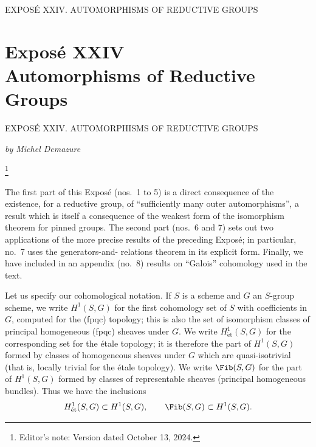 
  {EXPOSÉ XXIV. AUTOMORPHISMS OF REDUCTIVE GROUPS}

\setcounter{footnote}{0}
\chapter*{Exposé XXIV\\
Automorphisms of Reductive Groups}
  {EXPOSÉ XXIV. AUTOMORPHISMS OF REDUCTIVE GROUPS}

\begin{center}
  \textit{by Michel Demazure}
\end{center}

\begingroup
\renewcommand{\thefootnote}{0}
\footnote{Editor's note: Version dated October 13, 2024.}
\addtocounter{footnote}{-1}
\endgroup
The first part of this Exposé (nos.~1 to 5) is a direct consequence of
the existence, for a reductive group, of ``sufficiently many outer
automorphisms'', a result which is itself a consequence of the weakest
form of the isomorphism theorem for pinned groups. The second part
(nos.~6 and 7) sets out two applications of the more precise results of
the preceding Exposé; in particular, no.~7 uses the generators-and-
relations theorem in its explicit form. Finally, we have included in
an appendix (no.~8) results on ``Galois'' cohomology used in the text.

Let us specify our cohomological notation. If \(S\) is a scheme and
\(G\) an \(S\)-group scheme, we write \(H^1(S,G)\) for the first
cohomology set of \(S\) with coefficients in \(G\), computed for the
\textup{(fpqc)} topology; this is also the set of isomorphism classes
of principal homogeneous \textup{(fpqc)} sheaves under \(G\). We write
\(H^1_{\mathrm{\acute et}}(S,G)\) for the corresponding set for the
étale topology; it is therefore the part of \(H^1(S,G)\) formed by
classes of homogeneous sheaves under \(G\) which are quasi-isotrivial
\textup{(that is, locally trivial for the étale topology)}. We write
\(\Fib(S,G)\) for the part of \(H^1(S,G)\) formed by classes of
representable sheaves \textup{(principal homogeneous bundles)}. Thus
we have the inclusions
\[
  H^1_{\mathrm{\acute et}}(S,G)\subset H^1(S,G),
  \qquad
  \Fib(S,G)\subset H^1(S,G).
\]

